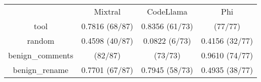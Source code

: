 \begin{table}[h!]
\centering
\begin{tabular}{|c|c|c|c|}
\hline
 & Mixtral & CodeLlama & Phi \\

tool & 0.7816 (68/87) & 0.8356 (61/73) & \cellcolor{blue!10}{1.0000} (77/77) \\

random & 0.4598 (40/87) & 0.0822 (6/73) & 0.4156 (32/77) \\

benign_comments & \cellcolor{blue!10}{0.9425} (82/87) & \cellcolor{blue!10}{1.0000} (73/73) & 0.9610 (74/77) \\

benign_rename & 0.7701 (67/87) & 0.7945 (58/73) & 0.4935 (38/77) \\

\end{tabular}
\end{table}